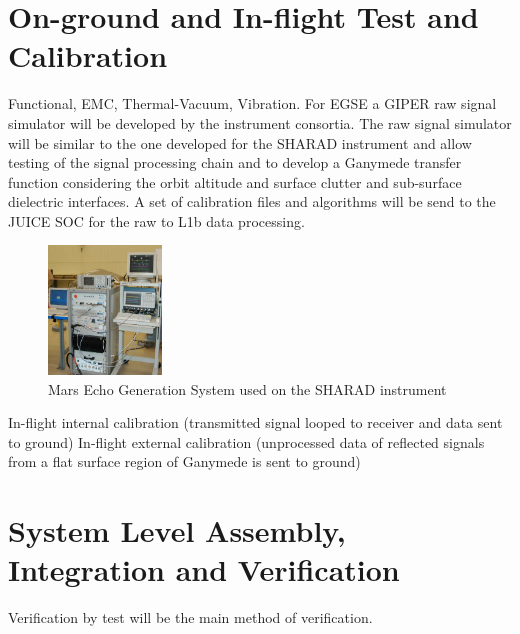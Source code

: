 \section{On-ground and In-flight Test and Calibration}
%
Functional, EMC, Thermal-Vacuum, Vibration.
%
%
For \ac{EGSE} a \ac{GIPER} raw signal simulator will be developed by the instrument consortia. The raw signal simulator will be similar to the one developed for the \ac{SHARAD} instrument\cite{Giovanni} and allow testing of the signal processing chain and to develop a Ganymede transfer function considering the orbit altitude and surface clutter and sub-surface dielectric interfaces. 
%
%
A set of calibration files and algorithms will be send to the JUICE \ac{SOC} for the raw to L1b data processing.
\begin{figure}
\centering
\includegraphics[width=0.27\textwidth]{Figures/MEGS}
\caption[caption]{Mars Echo Generation System used on the SHARAD instrument\cite{MEGS}}
\label{fig:MEGS}
\end{figure}
%
%
In-flight internal calibration (transmitted signal looped to receiver and data sent to ground)
In-flight external calibration (unprocessed data of reflected signals from a flat surface region of Ganymede is sent to ground)
%
%
\section{System Level Assembly, Integration and Verification}
Verification by test will be the main method of verification.

